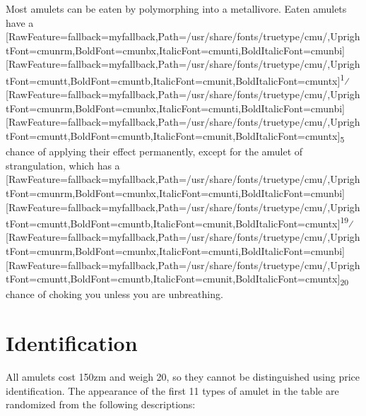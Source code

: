 Most amulets can be eaten\footnotemark[61] by polymorphing into a metallivore\footnotemark[62]. Eaten amulets have a \allowbreak{}\setmainfont{cmunrm.ttf}[RawFeature={fallback=myfallback},Path=/usr/share/fonts/truetype/cmu/,UprightFont=cmunrm,BoldFont=cmunbx,ItalicFont=cmunti,BoldItalicFont=cmunbi]\setmonofont{cmunrm.ttf}[RawFeature={fallback=myfallback},Path=/usr/share/fonts/truetype/cmu/,UprightFont=cmuntt,BoldFont=cmuntb,ItalicFont=cmunit,BoldItalicFont=cmuntx]\textsuperscript{1}⁄\allowbreak{}\setmainfont{cmunrm.ttf}[RawFeature={fallback=myfallback},Path=/usr/share/fonts/truetype/cmu/,UprightFont=cmunrm,BoldFont=cmunbx,ItalicFont=cmunti,BoldItalicFont=cmunbi]\setmonofont{cmunrm.ttf}[RawFeature={fallback=myfallback},Path=/usr/share/fonts/truetype/cmu/,UprightFont=cmuntt,BoldFont=cmuntb,ItalicFont=cmunit,BoldItalicFont=cmuntx]\textsubscript{5} chance of applying their effect permanently, except for the amulet of strangulation, which has a \allowbreak{}\setmainfont{cmunrm.ttf}[RawFeature={fallback=myfallback},Path=/usr/share/fonts/truetype/cmu/,UprightFont=cmunrm,BoldFont=cmunbx,ItalicFont=cmunti,BoldItalicFont=cmunbi]\setmonofont{cmunrm.ttf}[RawFeature={fallback=myfallback},Path=/usr/share/fonts/truetype/cmu/,UprightFont=cmuntt,BoldFont=cmuntb,ItalicFont=cmunit,BoldItalicFont=cmuntx]\textsuperscript{19}⁄\allowbreak{}\setmainfont{cmunrm.ttf}[RawFeature={fallback=myfallback},Path=/usr/share/fonts/truetype/cmu/,UprightFont=cmunrm,BoldFont=cmunbx,ItalicFont=cmunti,BoldItalicFont=cmunbi]\setmonofont{cmunrm.ttf}[RawFeature={fallback=myfallback},Path=/usr/share/fonts/truetype/cmu/,UprightFont=cmuntt,BoldFont=cmuntb,ItalicFont=cmunit,BoldItalicFont=cmuntx]\textsubscript{20} chance of choking you unless you are unbreathing\footnotemark[63].



\section{Identification}
\label{4}
All amulets cost 150zm\footnotemark[64] and weigh 20, so they cannot be distinguished using price identification\footnotemark[65]. The appearance of the first 11 types of amulet in the table are randomized\footnotemark[66] from the following descriptions:




